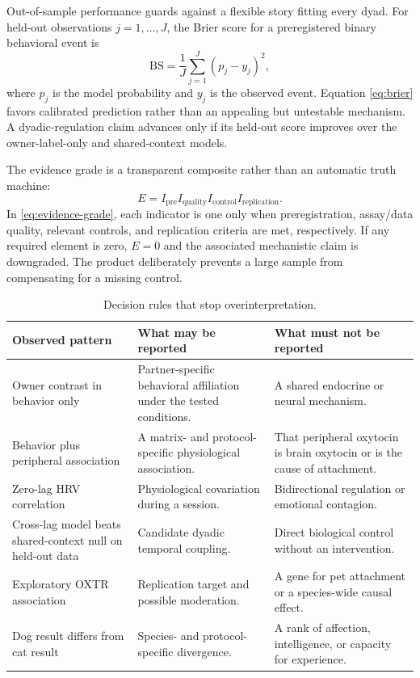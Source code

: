 \documentclass[conference]{IEEEtran}
\begin{document}
Out-of-sample performance guards against a flexible story fitting every dyad. For held-out observations $j=1,\ldots,J$, the Brier score for a preregistered binary behavioral event is
\begin{equation}
\mathrm{BS}=\frac{1}{J}\sum_{j=1}^{J}\left(p_j-y_j\right)^2,
\label{eq:brier}
\end{equation}
where $p_j$ is the model probability and $y_j$ is the observed event. Equation \eqref{eq:brier} favors calibrated prediction rather than an appealing but untestable mechanism. A dyadic-regulation claim advances only if its held-out score improves over the owner-label-only and shared-context models.

The evidence grade is a transparent composite rather than an automatic truth machine:
\begin{equation}
E=I_{\mathrm{pre}}I_{\mathrm{quality}}I_{\mathrm{control}}I_{\mathrm{replication}}.
\label{eq:evidence-grade}
\end{equation}
In \eqref{eq:evidence-grade}, each indicator is one only when preregistration, assay/data quality, relevant controls, and replication criteria are met, respectively. If any required element is zero, $E=0$ and the associated mechanistic claim is downgraded. The product deliberately prevents a large sample from compensating for a missing control.

\begin{table}[t]
\caption{Decision rules that stop overinterpretation.}
\label{tab:decisions}
\centering
\footnotesize
\begin{tabular}{p{}p{}p{}}
\toprule
\textbf{Observed pattern} & \textbf{What may be reported} & \textbf{What must not be reported} \\
\midrule
Owner contrast in behavior only & Partner-specific behavioral affiliation under the tested conditions. & A shared endocrine or neural mechanism. \\
Behavior plus peripheral association & A matrix- and protocol-specific physiological association. & That peripheral oxytocin is brain oxytocin or is the cause of attachment. \\
Zero-lag HRV correlation & Physiological covariation during a session. & Bidirectional regulation or emotional contagion. \\
Cross-lag model beats shared-context null on held-out data & Candidate dyadic temporal coupling. & Direct biological control without an intervention. \\
Exploratory OXTR association & Replication target and possible moderation. & A gene for pet attachment or a species-wide causal effect. \\
Dog result differs from cat result & Species- and protocol-specific divergence. & A rank of affection, intelligence, or capacity for experience. \\
\bottomrule
\end{tabular}
\end{table}
\end{document}
